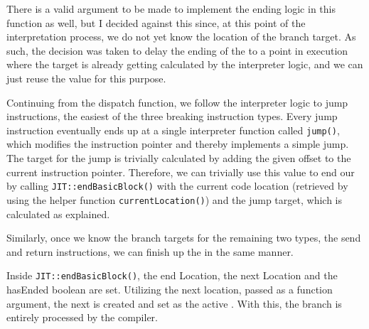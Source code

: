 There is a valid argument to be made to implement the \bb{} ending logic in this function as well, but I decided against this since, at this point of the interpretation process, we do not yet know the location of the branch target. As such, the decision was taken to delay the ending of the \bbs{} to a point in execution where the target is already getting calculated by the interpreter logic, and we can just reuse the value for this purpose. 

Continuing from the dispatch function, we follow the interpreter logic to jump instructions, the easiest of the three breaking instruction types.
Every jump instruction eventually ends up at a single interpreter function called \texttt{jump()}, which modifies the instruction pointer and thereby implements a simple jump.
The target for the jump is trivially calculated by adding the given offset to the current instruction pointer. Therefore, we can trivially use this value to end our \bb{} by calling \texttt{JIT::endBasicBlock()} with the current code location (retrieved by using the helper function \texttt{currentLocation()}) and the jump target, which is calculated as explained. 

Similarly, once we know the branch targets for the remaining two types, the send and return instructions, we can finish up the \bbs{} in the same manner.

Inside \texttt{JIT::endBasicBlock()}, the end Location, the next Location and the hasEnded boolean are set. Utilizing the next location, passed as a function argument, the next \bb{} is created and set as the active \bb{}. With this, the branch is entirely processed by the \jit{} compiler. 

